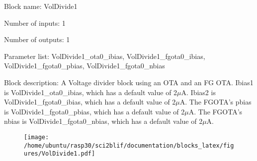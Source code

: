 \pagebreak

Block name: VolDivide1

Number of inputs: 1

Number of outputs: 1

Parameter list: VolDivide1\_ota0\_ibias, VolDivide1\_fgota0\_ibias, VolDivide1\_fgota0\_pbias, VolDivide1\_fgota0\_nbias

Block description: 
A Voltage divider block using an OTA and an FG OTA. Ibias1 is VolDivide1\_ota0\_ibias, which has a default value of 2$\mu$A. Ibias2 is VolDivide1\_fgota0\_ibias, which has a default value of 2$\mu$A. The FGOTA's pbias is VolDivide1\_fgota0\_pbias, which has a default value of 2$\mu$A. The FGOTA's nbias is VolDivide1\_fgota0\_nbias, which has a default value of 2$\mu$A. 

\begin{figure}[H]  %
\texttt{[image: /home/ubuntu/rasp30/sci2blif/documentation/blocks\_latex/figures/VolDivide1.pdf]}
\end{figure}

